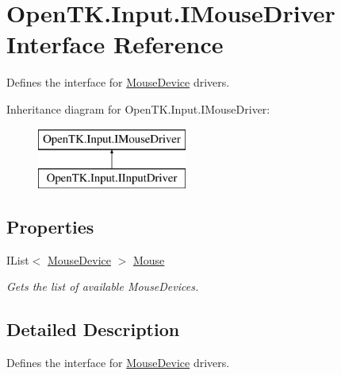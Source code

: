 \hypertarget{interface_open_t_k_1_1_input_1_1_i_mouse_driver}{\section{Open\-T\-K.\-Input.\-I\-Mouse\-Driver Interface Reference}
\label{interface_open_t_k_1_1_input_1_1_i_mouse_driver}
}


Defines the interface for \hyperlink{class_open_t_k_1_1_input_1_1_mouse_device}{Mouse\-Device} drivers.  


Inheritance diagram for Open\-T\-K.\-Input.\-I\-Mouse\-Driver\-:\begin{figure}[H]
\begin{center}
\leavevmode
\includegraphics[height=2.000000cm]{interface_open_t_k_1_1_input_1_1_i_mouse_driver}
\end{center}
\end{figure}
\subsection*{Properties}
\begin{DoxyCompactItemize}
\item 
I\-List$<$ \hyperlink{class_open_t_k_1_1_input_1_1_mouse_device}{Mouse\-Device} $>$ \hyperlink{interface_open_t_k_1_1_input_1_1_i_mouse_driver_a1296e581e67f3306448f4ca426e50bd2}{Mouse}
\begin{DoxyCompactList}\small\item\em Gets the list of available Mouse\-Devices. \end{DoxyCompactList}\end{DoxyCompactItemize}


\subsection{Detailed Description}
Defines the interface for \hyperlink{class_open_t_k_1_1_input_1_1_mouse_device}{Mouse\-Device} drivers. 



